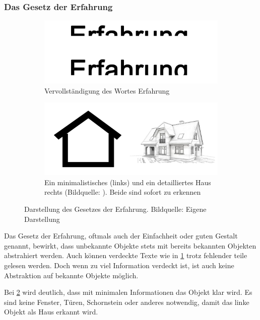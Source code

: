 \subsubsection{Das Gesetz der Erfahrung}
\begin{figure}[ht]
\begin{subfigure}{.5\linewidth}
  \centering
  \includegraphics[width=.95\linewidth]{img/gErfahrung}  
  \caption{Vervollständigung des Wortes \glqq Erfahrung\grqq}
  \label{fig:erfahrung1}
\end{subfigure}
\begin{subfigure}{.5\linewidth}
  \centering
  \includegraphics[width=.95\linewidth]{img/gErfahrung2}  
  \caption{Ein minimalistisches (links) und ein detailliertes Haus rechts (Bildquelle: \cite{yedraw.}). Beide sind sofort zu erkennen}
  \label{fig:erfahrung2}
\end{subfigure}
\caption[Gesetz der Erfahrung]{Darstellung des Gesetzes der Erfahrung. Bildquelle: Eigene Darstellung}
\label{fig:erfahrung}
\end{figure}
Das Gesetz der Erfahrung, oftmals auch der Einfachheit oder guten Gestalt genannt, bewirkt, dass unbekannte Objekte stets mit bereits bekannten Objekten abstrahiert werden.
Auch können verdeckte Texte wie in \ref{fig:erfahrung1} trotz fehlender teile gelesen werden.
Doch wenn zu viel Information verdeckt ist, ist auch keine Abstraktion auf bekannte Objekte möglich.

Bei \ref{fig:erfahrung2} wird deutlich, dass mit minimalen Informationen das Objekt klar wird.
Es sind keine Fenster, Türen, Schornstein oder anderes notwendig, damit das linke Objekt als Haus erkannt wird.

